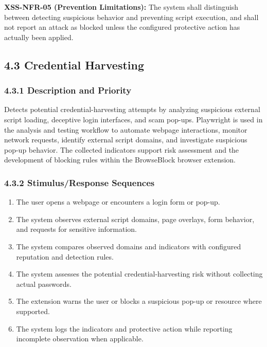 \documentclass[12pt,a4paper]{report}
\let\originaladdcontentsline\addcontentsline
\renewcommand{\addcontentsline}[3]{\phantomsection\originaladdcontentsline{#1}{#2}{#3}}
\begin{document}
\textbf{XSS-NFR-05 (Prevention Limitations):} The system shall distinguish between detecting suspicious behavior and preventing script execution, and shall not report an attack as blocked unless the configured protective action has actually been applied.\par

\subsection*{4.3 Credential Harvesting}

\subsubsection*{4.3.1 Description and Priority}

Detects potential credential-harvesting attempts by analyzing suspicious external script loading, deceptive login interfaces, and scam pop-ups. Playwright is used in the analysis and testing workflow to automate webpage interactions, monitor network requests, identify external script domains, and investigate suspicious pop-up behavior. The collected indicators support risk assessment and the development of blocking rules within the BrowseBlock browser extension.\par

\subsubsection*{4.3.2 Stimulus/Response Sequences}

\begin{enumerate}
\item The user opens a webpage or encounters a login form or pop-up.
\item The system observes external script domains, page overlays, form behavior, and requests for sensitive information.
\item The system compares observed domains and indicators with configured reputation and detection rules.
\item The system assesses the potential credential-harvesting risk without collecting actual passwords.
\item The extension warns the user or blocks a suspicious pop-up or resource where supported.
\item The system logs the indicators and protective action while reporting incomplete observation when applicable.
\end{enumerate}
\end{document}
